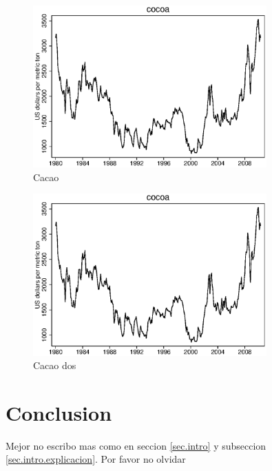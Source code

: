 \documentclass{article}
\begin{document}
    \begin{figure}[h]
    \centering
    \includegraphics[width=0.8\textwidth, angle=0]{acocoa.eps}
    \caption{Cacao}
    \label{cacao}
    \end{figure}

    \begin{figure}[h]
    \centering
    \includegraphics[width=0.8\textwidth, angle=0]{figures/acocoa.eps}
    \caption{Cacao dos}
    \label{cacao2}
    \end{figure}

\section{Conclusion}\label{sec.conclusion}
    Mejor no escribo mas como en seccion \ref{sec.intro} y subseccion \ref{sec.intro.explicacion}. Por favor no olvidar \cite{ben1994inventory}

\newpage
    
    
\end{document}
